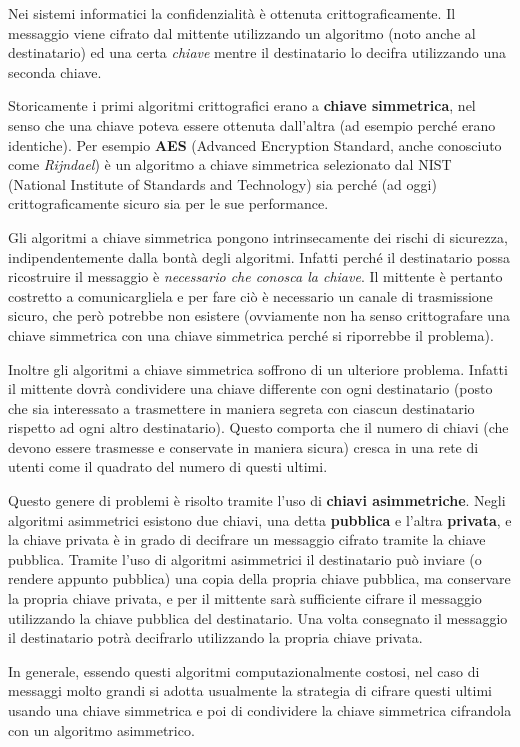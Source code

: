 \documentclass[italian,]{article}
\begin{document}
Nei sistemi informatici la confidenzialità è ottenuta
crittograficamente. Il messaggio viene cifrato dal mittente utilizzando
un algoritmo (noto anche al destinatario) ed una certa \emph{chiave}
mentre il destinatario lo decifra utilizzando una seconda chiave.

Storicamente i primi algoritmi crittografici erano a \textbf{chiave
simmetrica}, nel senso che una chiave poteva essere ottenuta dall'altra
(ad esempio perché erano identiche). Per esempio \textbf{AES} (Advanced
Encryption Standard, anche conosciuto come \emph{Rijndael}) è un
algoritmo a chiave simmetrica selezionato dal NIST (National Institute
of Standards and Technology) sia perché (ad oggi) crittograficamente
sicuro sia per le sue performance.

Gli algoritmi a chiave simmetrica pongono intrinsecamente dei rischi di
sicurezza, indipendentemente dalla bontà degli algoritmi. Infatti perché
il destinatario possa ricostruire il messaggio è \emph{necessario che
conosca la chiave}. Il mittente è pertanto costretto a comunicargliela e
per fare ciò è necessario un canale di trasmissione sicuro, che però
potrebbe non esistere (ovviamente non ha senso crittografare una chiave
simmetrica con una chiave simmetrica perché si riporrebbe il problema).

Inoltre gli algoritmi a chiave simmetrica soffrono di un ulteriore
problema. Infatti il mittente dovrà condividere una chiave differente
con ogni destinatario (posto che sia interessato a trasmettere in
maniera segreta con ciascun destinatario rispetto ad ogni altro
destinatario). Questo comporta che il numero di chiavi (che devono
essere trasmesse e conservate in maniera sicura) cresca in una rete di
utenti come il quadrato del numero di questi ultimi.

Questo genere di problemi è risolto tramite l'uso di \textbf{chiavi
asimmetriche}. Negli algoritmi asimmetrici esistono due chiavi, una
detta \textbf{pubblica} e l'altra \textbf{privata}, e la chiave privata
è in grado di decifrare un messaggio cifrato tramite la chiave pubblica.
Tramite l'uso di algoritmi asimmetrici il destinatario può inviare (o
rendere appunto pubblica) una copia della propria chiave pubblica, ma
conservare la propria chiave privata, e per il mittente sarà sufficiente
cifrare il messaggio utilizzando la chiave pubblica del destinatario.
Una volta consegnato il messaggio il destinatario potrà decifrarlo
utilizzando la propria chiave privata.

In generale, essendo questi algoritmi computazionalmente costosi, nel
caso di messaggi molto grandi si adotta usualmente la strategia di
cifrare questi ultimi usando una chiave simmetrica e poi di condividere
la chiave simmetrica cifrandola con un algoritmo asimmetrico.
\end{document}
